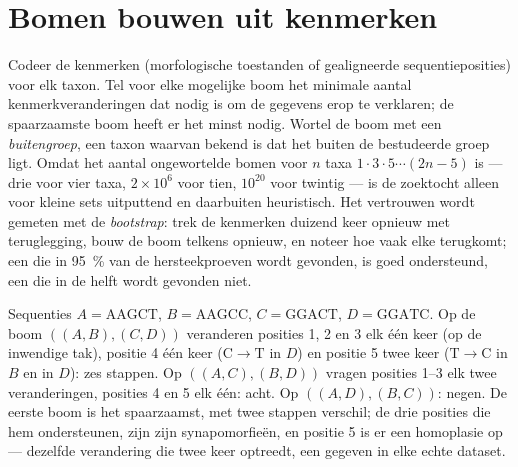 \section{Bomen bouwen uit kenmerken}

\begin{method}[Spaarzaamheid]\label{meth:b2:phylogenetic-trees:parsimony}
Codeer de kenmerken (morfologische toestanden of gealigneerde
sequentieposities) voor elk taxon. Tel voor elke mogelijke boom het
minimale aantal kenmerkveranderingen dat nodig is om de gegevens erop te
verklaren; de spaarzaamste boom heeft er het minst nodig. Wortel de boom met
een \emph{buitengroep}, een taxon waarvan bekend is dat het buiten de
bestudeerde groep ligt. Omdat het aantal ongewortelde bomen voor $n$ taxa $1\cdot 3\cdot
5\cdots(2n - 5)$ is --- drie voor vier taxa, $2\times 10^{6}$ voor tien,
$10^{20}$ voor twintig --- is de zoektocht alleen voor kleine sets
uitputtend en daarbuiten heuristisch. Het vertrouwen wordt gemeten met de
\emph{bootstrap}: trek de kenmerken duizend keer opnieuw met teruglegging,
bouw de boom telkens opnieuw, en noteer hoe vaak elke  terugkomt; een
 die in \qty{95}{\%} van de hersteekproeven wordt gevonden, is goed
ondersteund, een die in de helft wordt gevonden niet.
\end{method}

\begin{example}\label{ex:b2:phylogenetic-trees:parsimony}
Sequenties $A = \mathrm{AAGCT}$, $B = \mathrm{AAGCC}$, $C =
\mathrm{GGACT}$, $D = \mathrm{GGATC}$. Op de boom $((A,B),(C,D))$
veranderen posities 1, 2 en 3 elk één keer (op de inwendige tak), positie 4
één keer ($\mathrm{C}\to\mathrm{T}$ in $D$) en positie 5 twee keer
($\mathrm{T}\to\mathrm{C}$ in $B$ en in $D$): zes stappen. Op
$((A,C),(B,D))$ vragen posities 1--3 elk twee veranderingen, posities 4 en 5
elk één: acht. Op $((A,D),(B,C))$: negen. De eerste boom is het spaarzaamst,
met twee stappen verschil; de drie posities die hem ondersteunen, zijn
zijn synapomorfieën, en positie 5 is er een homoplasie op --- dezelfde
verandering die twee keer optreedt, een gegeven in elke echte dataset.
\end{example}

